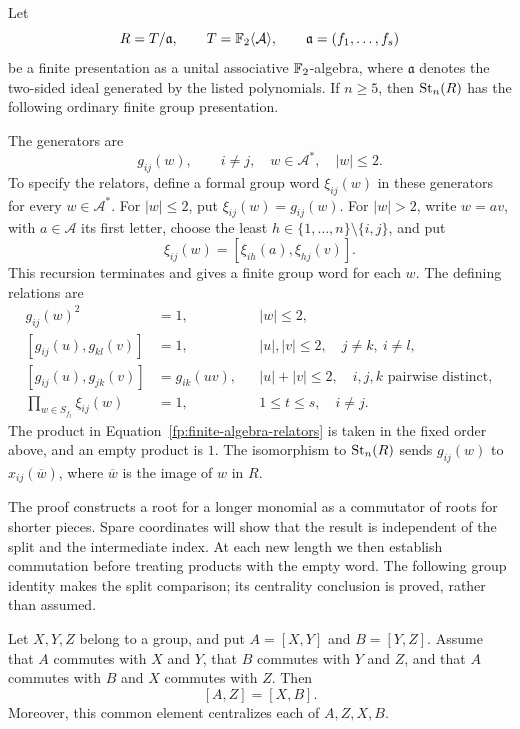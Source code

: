 \begin{theorem}
\label{thm:finite-presentation}
Let
\[
 R=T/\mathfrak a,
 \qquad
 T=\mathbb F_2\langle\mathcal A\rangle,
 \qquad
 \mathfrak a=(f_1,\ldots,f_s)
\]
be a finite presentation as a unital associative $\mathbb F_2$-algebra, where
$\mathfrak a$ denotes the two-sided ideal generated by the listed
polynomials.  If $n\geq5$, then $\operatorname{St}_n(R)$ has the following ordinary
finite group presentation.

The generators are
\[
 g_{ij}(w),\qquad i\neq j,\quad w\in\mathcal A^*,\quad |w|\leq2.
\]
To specify the relators, define a formal group word $\xi_{ij}(w)$ in
these generators for every $w\in\mathcal A^*$.  For $|w|\leq2$, put
$\xi_{ij}(w)=g_{ij}(w)$.  For $|w|>2$, write $w=av$, with
$a\in\mathcal A$ its first letter, choose the least
$h\in\{1,\ldots,n\}\setminus\{i,j\}$, and put
\[
 \xi_{ij}(w)=[\xi_{ih}(a),\xi_{hj}(v)].
\]
This recursion terminates and gives a finite group word for each $w$.
The defining relations are
\begin{align}
 g_{ij}(w)^2&=1,
 && |w|\leq2, \label{fp:finite-square}\\
 [g_{ij}(u),g_{kl}(v)]&=1,
 && |u|,|v|\leq2,\quad j\neq k,\ i\neq l,
 \label{fp:finite-commutation}\\
 [g_{ij}(u),g_{jk}(v)]&=g_{ik}(uv),
 && |u|+|v|\leq2,\quad i,j,k\text{ pairwise distinct},
 \label{fp:finite-product}\\
 \prod_{w\in S_{f_t}}\xi_{ij}(w)&=1,
 && 1\leq t\leq s,\quad i\neq j.
 \label{fp:finite-algebra-relators}
\end{align}
The product in Equation~\eqref{fp:finite-algebra-relators} is taken in
the fixed order above, and an empty product is $1$.  The isomorphism to
$\operatorname{St}_n(R)$ sends $g_{ij}(w)$ to $x_{ij}(\overline w)$, where
$\overline w$ is the image of $w$ in $R$.
\end{theorem}

The proof constructs a root for a longer monomial as a commutator of
roots for shorter pieces. Spare coordinates will show that the result
is independent of the split and the intermediate index. At each new
length we then establish commutation before treating products with the
empty word. The following group identity makes the split comparison;
its centrality conclusion is proved, rather than assumed.

\begin{lemma}
\label{fp:three-factor}
Let $X,Y,Z$ belong to a group, and put $A=[X,Y]$ and $B=[Y,Z]$.
Assume that $A$ commutes with $X$ and $Y$, that $B$ commutes with $Y$
and $Z$, and that $A$ commutes with $B$ and $X$ commutes with $Z$.
Then
\[
 [A,Z]=[X,B].
\]
Moreover, this common element centralizes each of $A,Z,X,B$.
\end{lemma}

